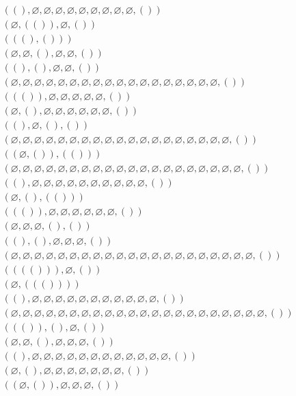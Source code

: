 \documentclass[12pt]{article}
\def\qua{()}
\newcommand{\quat}[1]{\left( #1 \right)}
\def\nul{\varnothing}
\begin{document}
\begin{align*}
&\quat{\qua,\nul,\nul,\nul,\nul,\nul,\nul,\nul,\nul,\nul,\qua}\\
&\quat{\nul,\quat{\qua},\nul,\qua}\\
&\quat{\quat{\qua,\qua}}\\
&\quat{\nul,\nul,\qua,\nul,\nul,\qua}\\
&\quat{\qua,\qua,\nul,\nul,\qua}\\
&\quat{\nul,\nul,\nul,\nul,\nul,\nul,\nul,\nul,\nul,\nul,\nul,\nul,\nul,\nul,\nul,\nul,\nul,\nul,\qua}\\
&\quat{\quat{\qua},\nul,\nul,\nul,\nul,\nul,\qua}\\
&\quat{\nul,\qua,\nul,\nul,\nul,\nul,\nul,\nul,\qua}\\
&\quat{\qua,\nul,\qua,\qua}\\
&\quat{\nul,\nul,\nul,\nul,\nul,\nul,\nul,\nul,\nul,\nul,\nul,\nul,\nul,\nul,\nul,\nul,\nul,\nul,\nul,\qua}\\
&\quat{\quat{\nul,\qua},\quat{\qua}}\\
&\quat{\nul,\nul,\nul,\nul,\nul,\nul,\nul,\nul,\nul,\nul,\nul,\nul,\nul,\nul,\nul,\nul,\nul,\nul,\nul,\nul,\qua}\\
&\quat{\qua,\nul,\nul,\nul,\nul,\nul,\nul,\nul,\nul,\nul,\nul,\qua}\\
&\quat{\nul,\qua,\quat{\qua}}\\
&\quat{\quat{\qua},\nul,\nul,\nul,\nul,\nul,\nul,\qua}\\
&\quat{\nul,\nul,\nul,\qua,\qua}\\
&\quat{\qua,\qua,\nul,\nul,\nul,\qua}\\
&\quat{\nul,\nul,\nul,\nul,\nul,\nul,\nul,\nul,\nul,\nul,\nul,\nul,\nul,\nul,\nul,\nul,\nul,\nul,\nul,\nul,\nul,\qua}\\
&\quat{\quat{\quat{\qua}},\nul,\qua}\\
&\quat{\nul,\quat{\quat{\qua}}}\\
&\quat{\qua,\nul,\nul,\nul,\nul,\nul,\nul,\nul,\nul,\nul,\nul,\nul,\qua}\\
&\quat{\nul,\nul,\nul,\nul,\nul,\nul,\nul,\nul,\nul,\nul,\nul,\nul,\nul,\nul,\nul,\nul,\nul,\nul,\nul,\nul,\nul,\nul,\qua}\\
&\quat{\quat{\qua},\qua,\nul,\qua}\\
&\quat{\nul,\nul,\qua,\nul,\nul,\nul,\qua}\\
&\quat{\qua,\nul,\nul,\nul,\nul,\nul,\nul,\nul,\nul,\nul,\nul,\nul,\nul,\qua}\\
&\quat{\nul,\qua,\nul,\nul,\nul,\nul,\nul,\nul,\nul,\qua}\\
&\quat{\quat{\nul,\qua},\nul,\nul,\nul,\qua}\\

\end{align*}
\end{document}
